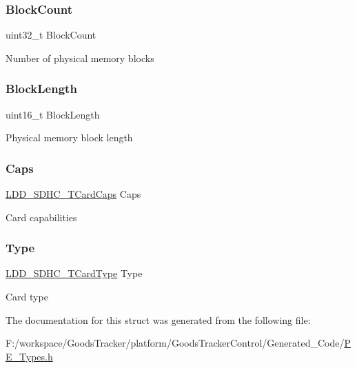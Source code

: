 \subsubsection{\texorpdfstring{Block\+Count}{BlockCount}}
{\footnotesize\ttfamily uint32\+\_\+t Block\+Count}

Number of physical memory blocks \mbox{\label{struct_l_d_d___s_d_h_c___t_card_info_a344d6d32d64c219e239fc8f82d9a2e35}} 
\subsubsection{\texorpdfstring{Block\+Length}{BlockLength}}
{\footnotesize\ttfamily uint16\+\_\+t Block\+Length}

Physical memory block length \mbox{\label{struct_l_d_d___s_d_h_c___t_card_info_ac2410f9a175b43777b0bddfc1b8346d1}} 
\subsubsection{\texorpdfstring{Caps}{Caps}}
{\footnotesize\ttfamily \hyperlink{struct_l_d_d___s_d_h_c___t_card_caps}{L\+D\+D\+\_\+\+S\+D\+H\+C\+\_\+\+T\+Card\+Caps} Caps}

Card capabilities \mbox{\label{struct_l_d_d___s_d_h_c___t_card_info_af74fa6aeb8c59c7fff7bc543ac714f9c}} 
\subsubsection{\texorpdfstring{Type}{Type}}
{\footnotesize\ttfamily \hyperlink{group___p_e___types__module_ga5344ded013ca3da273ed4f52c9c96fc7}{L\+D\+D\+\_\+\+S\+D\+H\+C\+\_\+\+T\+Card\+Type} Type}

Card type 

The documentation for this struct was generated from the following file\+:\begin{DoxyCompactItemize}
\item 
F\+:/workspace/\+Goods\+Tracker/platform/\+Goods\+Tracker\+Control/\+Generated\+\_\+\+Code/\hyperlink{_p_e___types_8h}{P\+E\+\_\+\+Types.\+h}\end{DoxyCompactItemize}
